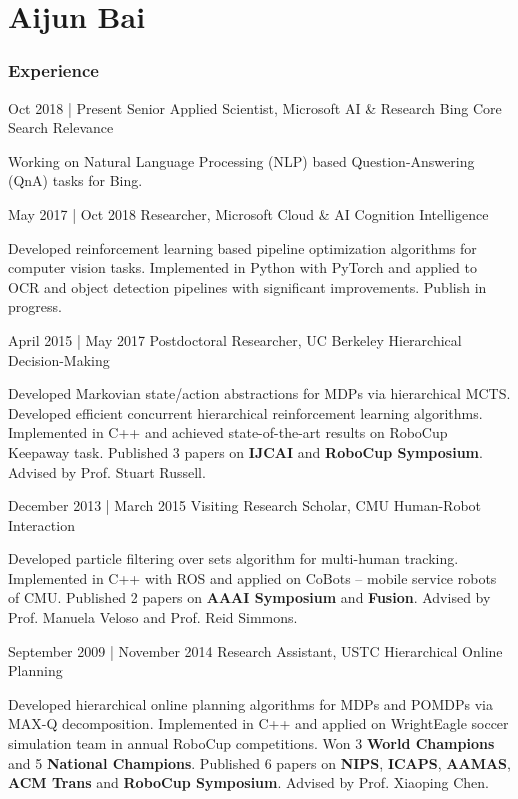 \documentclass[fontsize=10pt]{tccv}
\begin{document}
\part{Aijun Bai}

\section{Experience}

\begin{eventlist}

	\item{Oct 2018 | Present}
	      {Senior Applied Scientist, Microsoft AI \& Research}
	      {Bing Core Search Relevance}

    Working on Natural Language Processing (NLP) based Question-Answering (QnA) tasks for Bing.

	\item{May 2017 | Oct 2018}
	      {Researcher, Microsoft Cloud \& AI}
	      {Cognition Intelligence}

	Developed reinforcement learning based pipeline optimization algorithms for computer vision tasks. Implemented in Python with PyTorch and applied to OCR and object detection pipelines with significant improvements. Publish in progress.

	\item{April 2015 | May 2017}
	      {Postdoctoral Researcher, UC Berkeley}
	      {Hierarchical Decision-Making}

	Developed Markovian state/action abstractions for MDPs via hierarchical MCTS.  Developed efficient concurrent hierarchical reinforcement learning algorithms. Implemented in C++ and achieved state-of-the-art results on RoboCup Keepaway task. Published 3 papers on \textbf{IJCAI} and \textbf{RoboCup Symposium}. Advised by Prof. Stuart Russell.

	\item{December 2013 | March 2015}
	      {Visiting Research Scholar, CMU}
	      {Human-Robot Interaction}

	Developed particle filtering over sets algorithm for multi-human tracking. Implemented in C++ with ROS and applied on CoBots -- mobile service robots of CMU. Published 2 papers on \textbf{AAAI Symposium} and \textbf{Fusion}. Advised by Prof. Manuela Veloso and Prof. Reid Simmons.

	\item{September 2009 | November 2014}
	      {Research Assistant, USTC}
	      {Hierarchical Online Planning}

	Developed hierarchical online planning algorithms for MDPs and POMDPs via MAX-Q decomposition. Implemented in C++ and applied on WrightEagle soccer simulation team in annual RoboCup competitions. Won 3 \textbf{World Champions} and 5 \textbf{National Champions}.  Published 6 papers on \textbf{NIPS}, \textbf{ICAPS}, \textbf{AAMAS}, \textbf{ACM Trans} and \textbf{RoboCup  Symposium}. Advised by Prof. Xiaoping Chen.

\end{eventlist}
\end{document}
